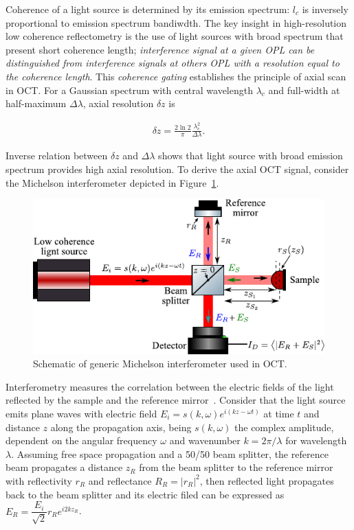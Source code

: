 Coherence of a light source is determined by its emission spectrum: $l_c$ is inversely proportional to emission spectrum bandiwdth. The key insight in high-resolution low coherence reflectometry is the use of light sources with broad spectrum that present short coherence length; \textit{interference signal at a given OPL can be distinguished from interference signals at others OPL with a resolution equal to the coherence length}. This \textit{coherence gating} establishes the principle of axial scan in OCT. For a Gaussian spectrum with central wavelength $\lambda_c$ and full-width at half-maximum $\Delta\lambda$, axial resolution $\delta z$ is

\begin{align}\label{eq:axialRes}
    \delta z = \frac{2\ln 2}{\pi}\frac{\lambda_c^2}{\Delta\lambda}.
\end{align}

Inverse relation between $\delta z$ and $\Delta\lambda$ shows that light source with broad emission spectrum provides high axial resolution. To derive the axial OCT signal, consider the Michelson interferometer depicted in Figure~\ref{fig:OCT_Model}.

\begin{figure}[htb!]
    \centering
    \includegraphics[width=.65\textwidth]{Figures/TheoreticalBasis/OCT_Model.pdf}
    \caption{Schematic of generic Michelson interferometer used in OCT.}
    \label{fig:OCT_Model}
\end{figure}

Interferometry measures the correlation between the electric fields of the light reflected by the sample and the reference mirror~\cite{Malacara2007_Optical}. Consider that the light source emits plane waves with electric field $E_i = s(k,\omega)e^{i(kz-\omega t)}$ at time $t$ and distance $z$ along the propagation axis, being $s(k,\omega)$ the complex amplitude, dependent on the angular frequency $\omega$ and wavenumber $k=2\pi / \lambda$ for wavelength $\lambda$. Assuming free space propagation and a 50/50 beam splitter, the reference beam propagates a distance $z_R$ from the beam splitter to the reference mirror with reflectivity $r_R$ and reflectance $R_R=|r_R|^2$, then reflected light propagates back to the beam splitter and its electric filed can be expressed as $E_R = \dfrac{E_i}{\sqrt{2}} r_R e^{i2kz_R}$.

